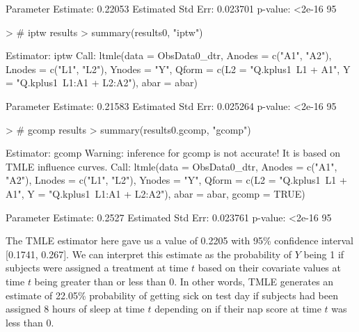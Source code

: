 \documentclass[answers]{exam}
\begin{document}
\begin{solution}
\begin{Schunk}
\begin{Soutput}
   Parameter Estimate:  0.22053 
    Estimated Std Err:  0.023701 
              p-value:  <2e-16 
    95%
\end{Soutput}
\end{Schunk}
\begin{Schunk}
\begin{Sinput}
> # iptw results
> summary(results0, "iptw")
\end{Sinput}
\begin{Soutput}
Estimator:  iptw 
Call:
ltmle(data = ObsData0_dtr, Anodes = c("A1", "A2"), Lnodes = c("L1", 
    "L2"), Ynodes = "Y", Qform = c(L2 = "Q.kplus1~L1 + A1", Y = "Q.kplus1~L1:A1 + L2:A2"), 
    abar = abar)

   Parameter Estimate:  0.21583 
    Estimated Std Err:  0.025264 
              p-value:  <2e-16 
    95%
\end{Soutput}
\end{Schunk}
\begin{Schunk}
\begin{Sinput}
> # gcomp results
> summary(results0.gcomp, "gcomp")
\end{Sinput}
\begin{Soutput}
Estimator:  gcomp 
Warning: inference for gcomp is not accurate! It is based on TMLE influence curves.
Call:
ltmle(data = ObsData0_dtr, Anodes = c("A1", "A2"), Lnodes = c("L1", 
    "L2"), Ynodes = "Y", Qform = c(L2 = "Q.kplus1~L1 + A1", Y = "Q.kplus1~L1:A1 + L2:A2"), 
    abar = abar, gcomp = TRUE)

   Parameter Estimate:  0.2527 
    Estimated Std Err:  0.023761 
              p-value:  <2e-16 
    95%
\end{Soutput}
\end{Schunk}

\noindent The TMLE estimator here gave us a value of 0.2205 with 95\% confidence interval [0.1741, 0.267]. We can interpret this estimate as the probability of $Y$ being 1 if subjects were assigned a treatment at time $t$ based on their covariate values at time $t$ being greater than or less than 0. In other words, TMLE generates an estimate of 22.05\% probability of getting sick on test day if subjects had been assigned 8 hours of sleep at time $t$ depending on if their nap score at time $t$ was less than 0.

\end{solution}

\pagebreak
\end{document}
